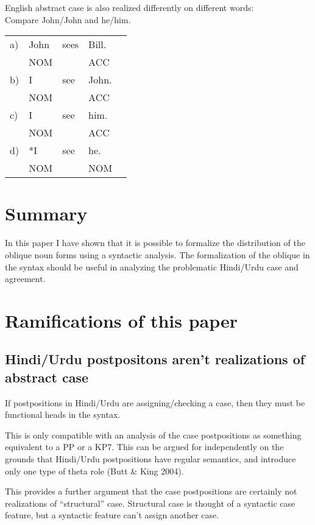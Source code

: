 \documentclass{article}
\begin{document}
\begin{example}English abstract case is also realized differently on different words:\\
Compare John/John and he/him.\\
\begin{tabular}{lllll}
a) & John & sees & Bill. & \\
~ & NOM & ~ & ACC\\
b) & I & see & John.\\
~ & NOM & ~ & ACC\\
c) & I & see & him.\\
~ & NOM & ~ & ACC\\
d) & *I & see & he.\\
~ & NOM & ~ & NOM\\
\end{tabular}
\end{example}

\section{Summary}

In this paper I have shown that it is possible to formalize the distribution of the oblique noun forms using a syntactic analysis. The formalization of the oblique in the syntax should be useful in analyzing the problematic Hindi/Urdu case and agreement.


\section{Ramifications of this paper}

\subsection{Hindi/Urdu postpositons aren't realizations of abstract case}

If postpositions in Hindi/Urdu are assigning/checking a case, then they must be functional heads in the syntax.

This is only compatible with an analysis of the case postpositions as something equivalent to a PP or a KP7. This can be argued for independently on the grounds that Hindi/Urdu postpositions have regular semantics, and introduce only one type of theta role (Butt \& King 2004).

This provides a further argument that the case postpositions are certainly not realizations of ``structural” case. Structural case is thought of a syntactic case feature, but a syntactic feature can't assign another case.
\end{document}
